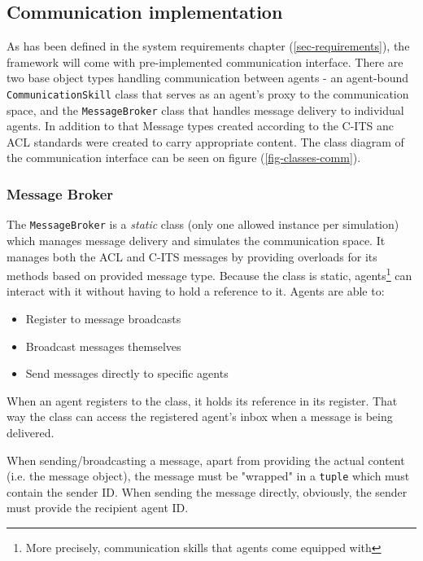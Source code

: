 \documentclass[main.tex]{subfiles}
\begin{document}
\subsection{Communication implementation}

As has been defined in the system requirements chapter (\ref{sec-requirements}), the 
framework will come with pre-implemented communication interface. There are two 
base object types handling communication between agents - an agent-bound 
\texttt{CommunicationSkill} class that serves as an agent's proxy to the communication 
space, and the \texttt{MessageBroker} class that handles message delivery to individual 
agents. In addition to that Message types created according to the C-ITS anc ACL 
standards were created to carry appropriate content. The class diagram of the 
communication interface can be seen on figure (\ref{fig-classes-comm}).

\subsubsection{Message Broker}

The \texttt{MessageBroker} is a \emph{static} class (only one allowed instance per 
simulation) which manages message delivery and simulates the communication space. 
It manages both the ACL and C-ITS messages by providing overloads for its methods 
based on provided message type. Because the class is static, agents\footnote{More precisely,
communication skills that agents come equipped with} can interact with it without 
having to hold a reference to it. Agents are able to:

\begin{itemize}
    \item Register to message broadcasts
    \item Broadcast messages themselves 
    \item Send messages directly to specific agents
\end{itemize}

When an agent registers to the class, it holds its reference in its register. 
That way the class can access the registered agent's inbox when a message is 
being delivered.

When sending/broadcasting a message, apart from providing the actual content (i.e. 
the message object), the message must be "wrapped" in a \texttt{tuple} which must 
contain the sender ID. When sending the message directly, obviously, the sender must 
provide the recipient agent ID. 
\end{document}
